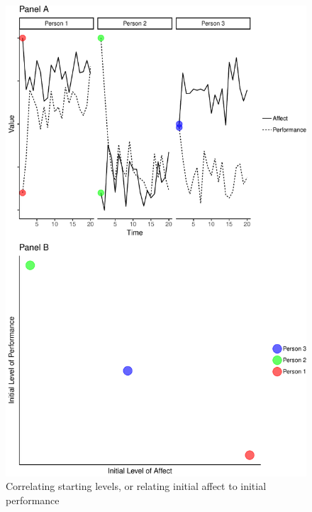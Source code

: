 \documentclass[english,,man]{apa6}
\theoremstyle{definition}
\theoremstyle{definition}
\theoremstyle{definition}
\theoremstyle{remark}
\begin{document}
\begin{figure}
\centering
\includegraphics{figures/unnamed-chunk-9-1.pdf}
\caption{\label{fig:unnamed-chunk-9}Correlating starting levels, or relating
initial affect to initial performance\label{level_correlate}}
\end{figure}
\end{document}
